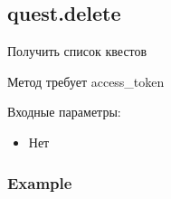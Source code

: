 \subsection{quest.delete}
Получить список квестов

Метод требует access\_token

Входные параметры:
\begin{itemize}
  \item Нет
\end{itemize}

\subsubsection{Example}
\begin{Verbatim}[frame=single]

\end{Verbatim}
